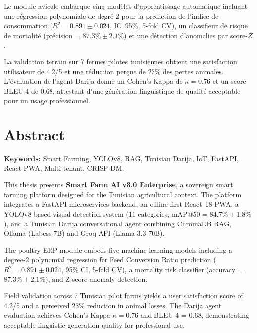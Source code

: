 \documentclass[12pt,a4paper,twoside]{report}
\newcommand{\ic}[2]{$#1 \pm #2$}
\newcounter{hi}
\begin{document}
Le module avicole embarque cinq modèles d'apprentissage automatique incluant
une régression polynomiale de degré 2 pour la prédiction de l'indice de
consommation ($R^2 = 0.891 \pm 0.024$, IC~95\%, 5-fold CV), un classifieur
de risque de mortalité (précision = \ic{87.3\%}{2.1\%}) et une détection
d'anomalies par score-$Z$.

La validation terrain sur 7 fermes pilotes tunisiennes obtient une satisfaction
utilisateur de 4.2/5 et une réduction perçue de 23\% des pertes animales.
L'évaluation de l'agent Darija donne un Cohen's Kappa de $\kappa = 0.76$
et un score BLEU-4 de 0.68, attestant d'une génération linguistique de
qualité acceptable pour un usage professionnel.

\chapter*{Abstract}
\begin{tcolorbox}[colback=gray!5,colframe=gray!50]
\textbf{Keywords:} Smart Farming, YOLOv8, RAG, Tunisian Darija,
IoT, FastAPI, React PWA, Multi-tenant, CRISP-DM.
\end{tcolorbox}

\medskip
This thesis presents \textbf{Smart Farm AI v3.0 Enterprise}, a sovereign
smart farming platform designed for the Tunisian agricultural context.
The platform integrates a FastAPI microservices backend, an offline-first
React~18 PWA, a YOLOv8-based visual detection system (11 categories,
mAP@50 = \ic{84.7\%}{1.8\%}), and a Tunisian Darija conversational
agent combining ChromaDB RAG, Ollama (Labess-7B) and Groq API (Llama-3.3-70B).

The poultry ERP module embeds five machine learning models including a
degree-2 polynomial regression for Feed Conversion Ratio prediction
($R^2 = 0.891 \pm 0.024$, 95\% CI, 5-fold CV), a mortality risk
classifier (accuracy = \ic{87.3\%}{2.1\%}), and Z-score anomaly detection.

Field validation across 7 Tunisian pilot farms yields a user satisfaction
score of 4.2/5 and a perceived 23\% reduction in animal losses.
The Darija agent evaluation achieves Cohen's Kappa $\kappa = 0.76$ and
BLEU-4 = 0.68, demonstrating acceptable linguistic generation quality
for professional use.

\setcounter{page}{1}
\tableofcontents
\listoffigures
\listoftables
\end{document}
